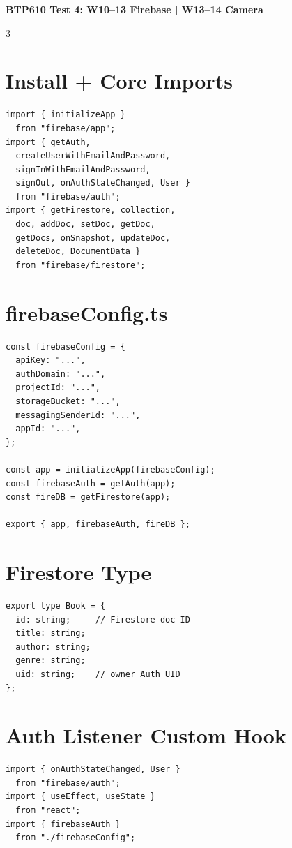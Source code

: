 \documentclass[8pt,a4paper]{extarticle}
\begin{document}
\begin{center}
{\small\bfseries BTP610 Test 4: W10--13 Firebase | W13--14 Camera}
\end{center}
\vspace{-4pt}

\begin{multicols}{3}

\section*{Install + Core Imports}
\begin{lstlisting}
import { initializeApp }
  from "firebase/app";
import { getAuth,
  createUserWithEmailAndPassword,
  signInWithEmailAndPassword,
  signOut, onAuthStateChanged, User }
  from "firebase/auth";
import { getFirestore, collection,
  doc, addDoc, setDoc, getDoc,
  getDocs, onSnapshot, updateDoc,
  deleteDoc, DocumentData }
  from "firebase/firestore";
\end{lstlisting}

\section*{firebaseConfig.ts}
\begin{lstlisting}
const firebaseConfig = {
  apiKey: "...",
  authDomain: "...",
  projectId: "...",
  storageBucket: "...",
  messagingSenderId: "...",
  appId: "...",
};

const app = initializeApp(firebaseConfig);
const firebaseAuth = getAuth(app);
const fireDB = getFirestore(app);

export { app, firebaseAuth, fireDB };
\end{lstlisting}

\section*{Firestore Type}
\begin{lstlisting}
export type Book = {
  id: string;     // Firestore doc ID
  title: string;
  author: string;
  genre: string;
  uid: string;    // owner Auth UID
};
\end{lstlisting}

\section*{Auth Listener Custom Hook}
\begin{lstlisting}
import { onAuthStateChanged, User }
  from "firebase/auth";
import { useEffect, useState }
  from "react";
import { firebaseAuth }
  from "./firebaseConfig";


\end{lstlisting}
\end{multicols}
\end{document}
